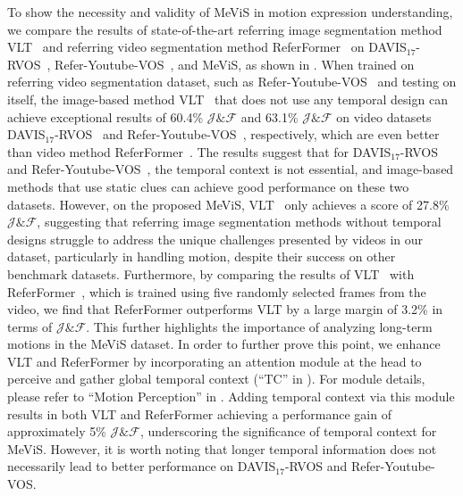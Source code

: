 \documentclass[10pt,twocolumn,letterpaper]{article}
\newcommand{\ourdataset}{MeViS\xspace}
\begin{document}
To show the necessity and validity of \ourdataset in motion expression understanding, we compare the results of state-of-the-art referring image segmentation method VLT~\cite{vltpami} and referring video segmentation method ReferFormer~\cite{wu2022referformer} on DAVIS$_{17}$-RVOS~\cite{khoreva2018video}, Refer-Youtube-VOS~\cite{seo2020urvos}, and \ourdataset, as shown in . When trained on referring video segmentation dataset, such as Refer-Youtube-VOS~\cite{seo2020urvos} and testing on itself, the image-based method VLT~\cite{vltpami} that does not use any temporal design can achieve exceptional results of 60.4\% $\mathcal{J\&F}$ and 63.1\% $\mathcal{J\&F}$ on video datasets DAVIS$_{17}$-RVOS~\cite{khoreva2018video} and Refer-Youtube-VOS~\cite{seo2020urvos}, respectively, which are even better than video method ReferFormer~\cite{wu2022referformer}. The results suggest that for DAVIS$_{17}$-RVOS~\cite{khoreva2018video} and Refer-Youtube-VOS~\cite{seo2020urvos}, the temporal context is not essential, and image-based methods that use static clues can achieve good performance on these two datasets. However, on the proposed \ourdataset, VLT~\cite{vltpami} only achieves a score of 27.8\% $\mathcal{J\&F}$, suggesting that referring image segmentation methods without temporal designs struggle to address the unique challenges presented by videos in our dataset, particularly in handling motion, despite their success on other benchmark datasets. Furthermore, by comparing the results of VLT~\cite{vltpami} with ReferFormer~\cite{wu2022referformer}, which is trained using five randomly selected frames from the video, we find that ReferFormer outperforms VLT by a large margin of {3.2\%} in terms of $\mathcal{J\&F}$. This further highlights the importance of analyzing long-term motions in the \ourdataset dataset. In order to further prove this point, we enhance VLT and ReferFormer by incorporating an attention module at the head to perceive and gather global temporal context (``TC'' in ). For module details, please refer to ``Motion Perception'' in . Adding temporal context via this module results in both VLT and ReferFormer achieving a performance gain of approximately 5\% $\mathcal{J\&F}$, underscoring the significance of temporal context for \ourdataset. However, it is worth noting that longer temporal information does not necessarily lead to better performance on DAVIS$_{17}$-RVOS and Refer-Youtube-VOS.
\end{document}
